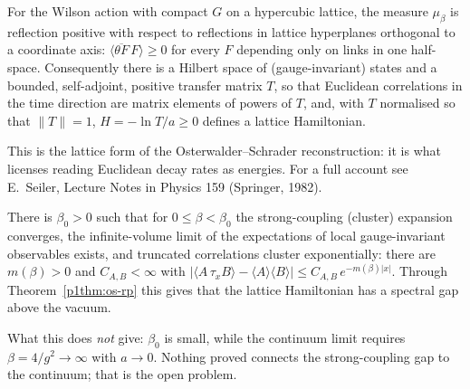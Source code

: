 \begin{theorem}\label{p1thm:os-rp}
For the Wilson action with compact $G$ on a hypercubic lattice, the measure $\mu_\beta$ is reflection positive with
respect to reflections in lattice hyperplanes orthogonal to a coordinate axis: $\langle\overline{\theta F}\,F\rangle\ge0$
for every $F$ depending only on links in one half-space. Consequently there is a Hilbert space of (gauge-invariant)
states and a bounded, self-adjoint, positive transfer matrix $T$, so that Euclidean correlations in the time
direction are matrix elements of powers of $T$, and, with $T$ normalised so that $\|T\|=1$, $H=-\ln T/a\ge0$ defines a lattice Hamiltonian.
\end{theorem}
\noindent This is the lattice form of the Osterwalder--Schrader reconstruction: it is what licenses reading Euclidean
decay rates as energies. For a full account see E.~Seiler, Lecture Notes in Physics 159 (Springer, 1982).

\begin{theorem}\label{p1thm:os-gap}
There is $\beta_0>0$ such that for $0\le\beta<\beta_0$ the strong-coupling (cluster) expansion converges, the
infinite-volume limit of the expectations of local gauge-invariant observables exists, and truncated correlations
cluster exponentially: there are $m(\beta)>0$ and $C_{A,B}<\infty$ with
$\bigl|\langle A\,\tau_xB\rangle-\langle A\rangle\langle B\rangle\bigr|\le C_{A,B}\,e^{-m(\beta)|x|}$.
Through Theorem~\ref{p1thm:os-rp} this gives that the lattice Hamiltonian has a spectral gap above the vacuum.
\end{theorem}
\noindent What this does \emph{not} give: $\beta_0$ is small, while the continuum limit requires $\beta=4/g^2\to\infty$
with $a\to0$. Nothing proved connects the strong-coupling gap to the continuum; that is the open problem.

